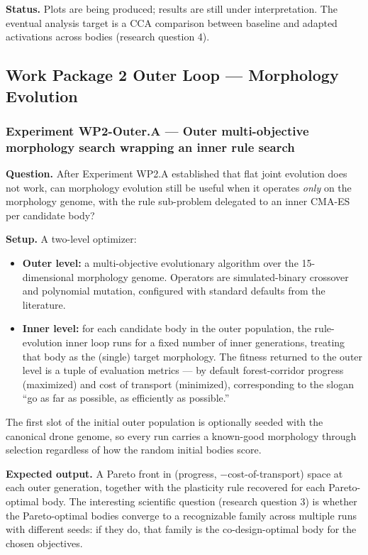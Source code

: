 \documentclass[letterpaper,10pt]{article}
\begin{document}
\textbf{Status.} Plots are being produced; results are still under interpretation. The eventual analysis target is a CCA comparison between baseline and adapted activations across bodies (research question 4).

\subsection{Work Package 2 Outer Loop --- Morphology Evolution}
\label{sec:wp2-outer-loop}

\subsubsection{Experiment WP2-Outer.A --- Outer multi-objective morphology search wrapping an inner rule search}
\textbf{Question.} After Experiment WP2.A established that flat joint evolution does not work, can morphology evolution still be useful when it operates \emph{only} on the morphology genome, with the rule sub-problem delegated to an inner CMA-ES per candidate body?

\textbf{Setup.} A two-level optimizer:
\begin{itemize}
    \item \textbf{Outer level:} a multi-objective evolutionary algorithm over the 15-dimensional morphology genome. Operators are simulated-binary crossover and polynomial mutation, configured with standard defaults from the literature.
    \item \textbf{Inner level:} for each candidate body in the outer population, the rule-evolution inner loop runs for a fixed number of inner generations, treating that body as the (single) target morphology. The fitness returned to the outer level is a tuple of evaluation metrics --- by default forest-corridor progress (maximized) and cost of transport (minimized), corresponding to the slogan ``go as far as possible, as efficiently as possible.''
\end{itemize}
The first slot of the initial outer population is optionally seeded with the canonical drone genome, so every run carries a known-good morphology through selection regardless of how the random initial bodies score.

\textbf{Expected output.} A Pareto front in (progress, $-$cost-of-transport) space at each outer generation, together with the plasticity rule recovered for each Pareto-optimal body. The interesting scientific question (research question 3) is whether the Pareto-optimal bodies converge to a recognizable family across multiple runs with different seeds: if they do, that family is the co-design-optimal body for the chosen objectives.
\end{document}
